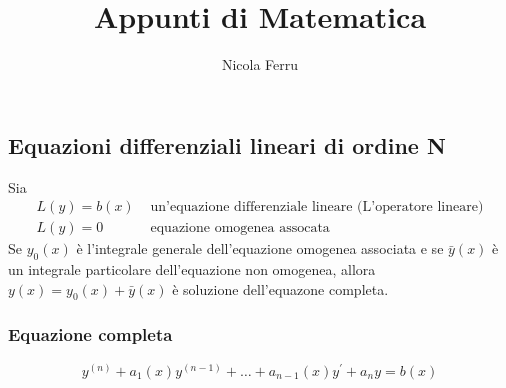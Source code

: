 \documentclass{book}
\title{Appunti di Matematica}
\author{Nicola Ferru}
\date{}
\begin{document}


\tableofcontents
\listoffigures









\subsection{Equazioni differenziali lineari di ordine N}
Sia
\begin{align*}
  L(y)=b(x) & \text{ un'equazione differenziale lineare (L'operatore lineare)} \\
  L(y)=0 & \text{ equazione omogenea assocata}
\end{align*}
Se $y_0(x)$ è l'integrale generale dell'equazione omogenea associata e se $\bar{y}(x)$ è
un integrale particolare dell'equazione non omogenea, allora $y(x)=y_0(x)+\bar{y}(x)$ è
soluzione dell'equazone completa.
\subsubsection{Equazione completa}
\begin{equation}
  y^{(n)}+a_1(x)y^{(n-1)}+\dots+a_{n-1}(x)y^{\prime}+a_ny=b(x)
\end{equation}
\clearpage
\end{document}
